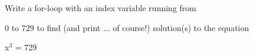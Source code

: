 Write a for-loop with an index variable running from

0 to 729 to find (and print ... of course!) solution(s) to the equation



\begin{center}

x$^{3}$ = 729

\end{center}

